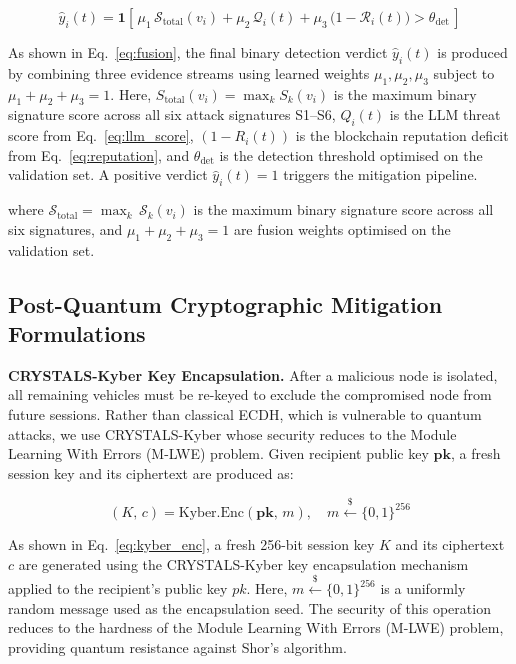\documentclass[12pt, a4paper]{report}
\begin{document}
\begin{equation}
\label{eq:fusion}
\hat{y}_i(t) = \mathbf{1}\!\left[\,
\mu_1\,\mathcal{S}_{\mathrm{total}}(v_i)
+ \mu_2\,\mathcal{Q}_i(t)
+ \mu_3\,\bigl(1 - \mathcal{R}_i(t)\bigr)
> \theta_{\mathrm{det}}
\,\right]
\end{equation}

As shown in Eq.~\eqref{eq:fusion}, the final binary detection verdict $\hat{y}_i(t)$ is produced by combining three evidence streams using learned weights $\mu_1, \mu_2, \mu_3$ subject to $\mu_1 + \mu_2 + \mu_3 = 1$. Here, $S_{\text{total}}(v_i) = \max_k S_k(v_i)$ is the maximum binary signature score across all six attack signatures S1--S6, $Q_i(t)$ is the LLM threat score from Eq.~\eqref{eq:llm_score}, $(1 - R_i(t))$ is the blockchain reputation deficit from Eq.~\eqref{eq:reputation}, and $\theta_{\text{det}}$ is the detection threshold optimised on the validation set. A positive verdict $\hat{y}_i(t) = 1$ triggers the mitigation pipeline.

\noindent where $\mathcal{S}_{\mathrm{total}} = \max_k\,\mathcal{S}_k(v_i)$
is the maximum binary signature score across all six signatures, and
$\mu_1 + \mu_2 + \mu_3 = 1$ are fusion weights optimised on the validation set.

\subsection{Post-Quantum Cryptographic Mitigation Formulations}

\textbf{CRYSTALS-Kyber Key Encapsulation.}
After a malicious node is isolated, all remaining vehicles must be re-keyed to
exclude the compromised node from future sessions. Rather than classical ECDH,
which is vulnerable to quantum attacks, we use CRYSTALS-Kyber whose security
reduces to the Module Learning With Errors (M-LWE) problem. Given recipient
public key $\mathbf{pk}$, a fresh session key and its ciphertext are produced as:

\begin{equation}
\label{eq:kyber_enc}
(K,\, c) = \mathrm{Kyber.Enc}(\mathbf{pk},\, m),
\quad m \xleftarrow{\$} \{0,1\}^{256}
\end{equation}

As shown in Eq.~\eqref{eq:kyber_enc}, a fresh 256-bit session key $K$ and its ciphertext $c$ are generated using the CRYSTALS-Kyber key encapsulation mechanism applied to the recipient's public key $pk$. Here, $m \xleftarrow{\$} \{0,1\}^{256}$ is a uniformly random message used as the encapsulation seed. The security of this operation reduces to the hardness of the Module Learning With Errors (M-LWE) problem, providing quantum resistance against Shor's algorithm.
\end{document}
